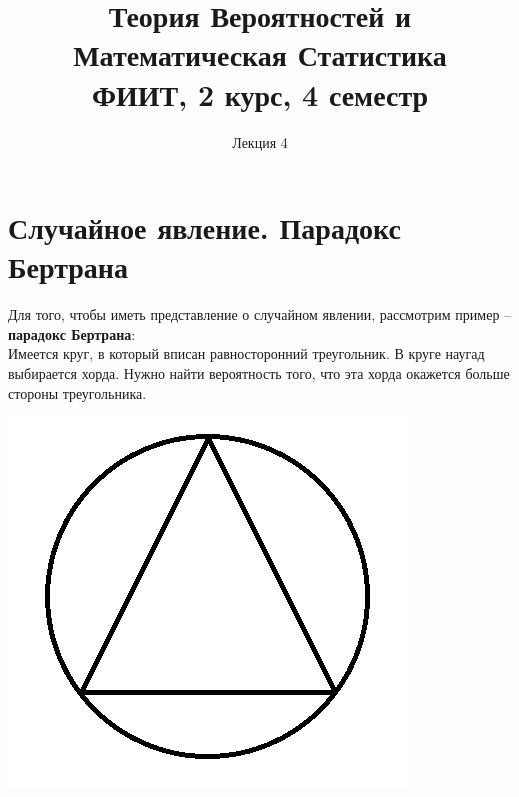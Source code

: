 \documentclass{article}
\title{Теория Вероятностей и Математическая Статистика\\
ФИИТ, 2 курс, 4 семестр}
\author{Лекция 4}
\begin{document}
\maketitle

\section{Случайное явление. Парадокс Бертрана}

Для того, чтобы иметь представление о случайном явлении, рассмотрим пример -- \textbf{парадокс Бертрана}:
\\


Имеется круг, в который вписан равносторонний треугольник. В круге наугад выбирается хорда. Нужно найти вероятность того, что эта хорда окажется больше стороны треугольника.

\begin{center}
    \includegraphics[scale=0.4]{1.png}
\end{center}
\end{document}
